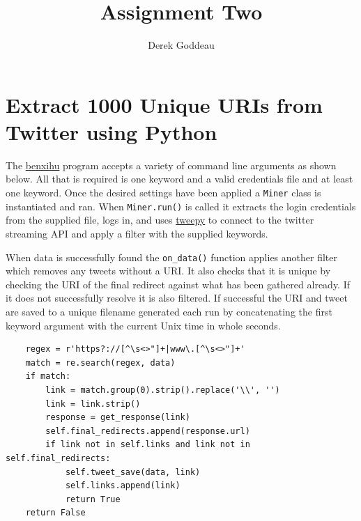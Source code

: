 \documentclass[12pt, a4paper]{article}
\author{Derek Goddeau}
\title{Assignment Two}
\newcommand{\code}[1]{\texttt{#1}}
\begin{document}
\maketitle

\newpage



%
%
\section{Extract 1000 Unique URIs from Twitter using Python}

The \href{https://gitlab.com/datenstrom/cs532-s17}{benxihu}
program accepts a variety of command line arguments as
shown below. All that is required is one keyword and a
valid credentials file and at least one keyword. Once
the desired settings have been applied a \code{Miner}
class is instantiated and ran. When \code{Miner.run()}
is called it extracts the login credentials from the
supplied file, logs in, and uses
\href{http://www.tweepy.org/}{tweepy} to connect to the
twitter streaming API and apply a filter with the supplied
keywords.

When data is successfully found the \code{on\_data()} function
applies another filter which removes any tweets without a URI.
It also checks that it is unique by checking the URI of the
final redirect against what has been gathered already. If it
does not successfully resolve it is also filtered.
If successful the URI and tweet are saved to a unique filename
generated each run by concatenating the first keyword argument
with the current Unix time in whole seconds.

\begin{minipage}{\linewidth} %
\vspace{2em}
\begin{verbatim}
    regex = r'https?://[^\s<>"]+|www\.[^\s<>"]+'
    match = re.search(regex, data)
    if match:
        link = match.group(0).strip().replace('\\', '')
        link = link.strip()
        response = get_response(link)
        self.final_redirects.append(response.url)
        if link not in self.links and link not in self.final_redirects:
            self.tweet_save(data, link)
            self.links.append(link)
            return True
    return False
\end{verbatim}
\end{minipage}
\end{document}
